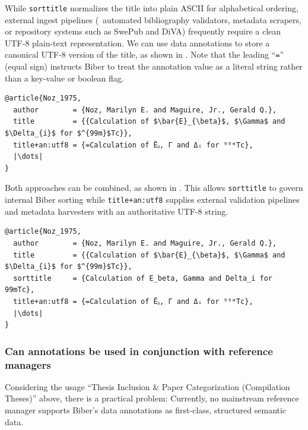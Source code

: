 \documentclass[12pt, twoside]{article}
\begin{document}
While \texttt{sorttitle} normalizes the title into plain ASCII for alphabetical ordering, external ingest pipelines (\eg\ automated bibliography validators, metadata scrapers, or repository systems such as SwePub and \gls{DiVA}) frequently require a clean UTF-8 plain-text representation. We can use \BibLaTeX{} data annotations to store a canonical UTF-8 version of the title, as shown in . Note that the leading \enquote{\texttt{=}} (equal sign) instructs Biber to treat the annotation value as a literal string rather than a key-value or boolean flag.

\begin{listing}[!ht]
\begin{verbatim}
@article{Noz_1975,
  author        = {Noz, Marilyn E. and Maguire, Jr., Gerald Q.},
  title         = {{Calculation of $\bar{E}_{\beta}$, $\Gamma$ and $\Delta_{i}$ for $^{99m}$Tc}},
  title+an:utf8 = {=Calculation of Ēᵦ, Γ and Δᵢ for ⁹⁹ᵐTc},
  |\dots|
}
\end{verbatim}
\caption{Using data annotations to represent math in titles}
\label{lst:biberMathInTitles}
\end{listing}
\FloatBarrier

Both approaches can be combined, as shown in . This allows \texttt{sorttitle} to govern internal Biber sorting while \texttt{title+an:utf8} supplies external validation pipelines and metadata harvesters with an authoritative UTF-8 string.

\begin{listing}[!ht]
\begin{verbatim}
@article{Noz_1975,
  author        = {Noz, Marilyn E. and Maguire, Jr., Gerald Q.},
  title         = {{Calculation of $\bar{E}_{\beta}$, $\Gamma$ and $\Delta_{i}$ for $^{99m}$Tc}},
  sorttitle     = {Calculation of E_beta, Gamma and Delta_i for 99mTc},
  title+an:utf8 = {=Calculation of Ēᵦ, Γ and Δᵢ for ⁹⁹ᵐTc},
  |\dots|
}
\end{verbatim}
\caption{Combining data annotations with sorttitle}
\label{lst:biberMathInTitlesCombined}
\end{listing}
\FloatBarrier

\subsubsection{Can annotations be used in conjunction with reference managers}
\label{sec:usingAnnotationsWithReferenceManagers}
Considering the usage \enquote{Thesis Inclusion \& Paper Categorization (Compilation Theses)} above, there is a practical problem: 
Currently, no mainstream reference manager supports Biber’s data annotations as first-class, structured semantic data.
\end{document}
